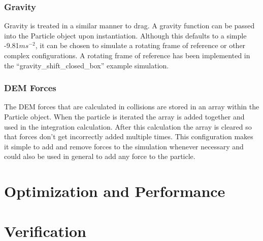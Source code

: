 \documentclass[10pt,a4paper,titlepage]{report}
\begin{document}
\subsubsection{Gravity}
Gravity is treated in a similar manner to drag. A gravity function can be passed into the Particle object upon instantiation. Although this defaults to a simple -9.81$ms^{-2}$, it can be chosen to simulate a rotating frame of reference or other complex configurations. A rotating frame of reference has been implemented in the ``gravity\_shift\_closed\_box'' example simulation. %
\subsubsection{DEM Forces}
The DEM forces that are calculated in collisions are stored in an array within the Particle object. When the particle is iterated the array is added together and used in the integration calculation. After this calculation the array is cleared so that forces don't get incorrectly added multiple times. This configuration makes it simple to add and remove forces to the simulation whenever necessary and could also be used in general to add any force to the particle.
\section{Optimization and Performance}
\section{Verification}
\end{document}
